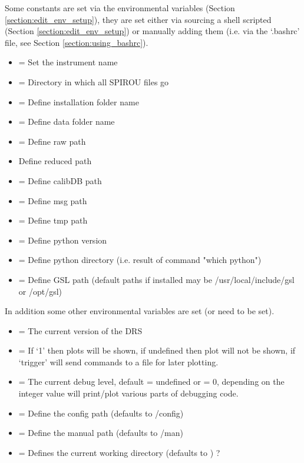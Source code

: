 Some constants are set via the environmental variables (Section \ref{section:edit_env_setup}), they are set either via sourcing a shell scripted (Section \ref{section:edit_env_setup}) or manually adding them (i.e. via the `.bashrc' file, see Section \ref{section:using_bashrc}).

\begin{itemize}
\item {} = Set the instrument name
\item {}= Directory in which all SPIROU files go
\item {} = Define installation folder name
\item {} = Define data folder name
\item {} = Define raw path
\item {} Define reduced path
\item {} = Define calibDB path
\item {} = Define msg path
\item {} = Define tmp path
\item {} = Define python version
\item {} = Define python directory (i.e. result of command "which python")
\item {} = Define GSL path (default paths if installed may be /usr/local/include/gsl or /opt/gsl)
\end{itemize}

In addition some other environmental variables are set (or need to be set).
\begin{itemize}
	\item {} = The current version of the DRS
	\item {} = If `1' then plots will be shown, if undefined then plot will not be shown, if `trigger' will send commands to a file for later plotting.
	\item {} = The current debug level, default = undefined or = 0, depending on the integer value will print/plot various parts of debugging code.
	\item {} = Define the config path (defaults to /config)
	\item {} = Define the manual path (defaults to /man)
	\item {} = Defines the current working directory (defaults to ) ?
\end{itemize} 

